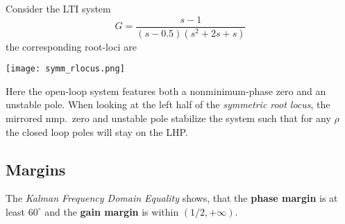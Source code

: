 \begin{examplesection}
    Consider the LTI system
    \noindent\begin{equation*}
        G = \frac{s-1}{(s-0.5)(s^2+2s+s)}
    \end{equation*}
    the corresponding root-loci are
    \begin{center}
        \texttt{[image: symm\_rlocus.png]}
    \end{center}
    Here the open-loop system features both a nonminimum-phase zero and an unstable pole.
    When looking at the left half of the \textit{symmetric root locus}, the mirrored nmp.\ zero and unstable pole stabilize the system such that
    for any $\rho$ the closed loop poles will stay on the LHP.
\end{examplesection}

\subsection{Margins}
The \textit{Kalman Frequency Domain Equality} shows, that the \textbf{phase margin} is at least $60^\circ$ and the \textbf{gain margin} is within $(1/2, +\infty)$.